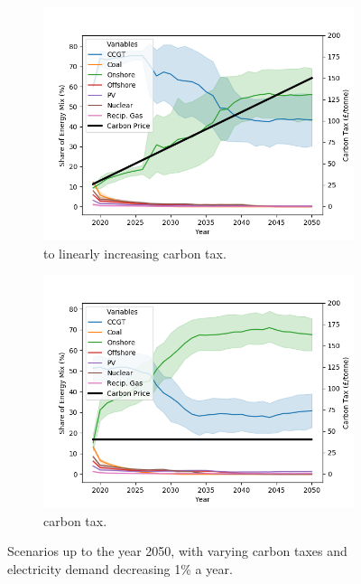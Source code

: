 \begin{figure}[h]
	\begin{subfigure}[b]{0.226\textwidth}   
		\centering 
		\includegraphics[width=\textwidth]{figures/scenarios/demand099-carbon18-datetime.png}
		\caption[]%
		{{ to  linearly increasing carbon tax.}}    
		\label{fig:demand99carbon18}
	\end{subfigure}
	\quad
	\begin{subfigure}[b]{0.226\textwidth}   
		\centering 
		\includegraphics[width=\textwidth]{figures/scenarios/demand099-carbon40-datetime.png}
		\caption[]%
		{{ carbon tax.}}    
		\label{fig:demand99carbon40}
	\end{subfigure}
	\caption[ Scenarios up to the year 2050 with varying carbon taxes and decreasing demand ]
	{\small Scenarios up to the year 2050, with varying carbon taxes and electricity demand decreasing 1\% a year.} 
	\label{fig:mean and std of nets}
\end{figure}








